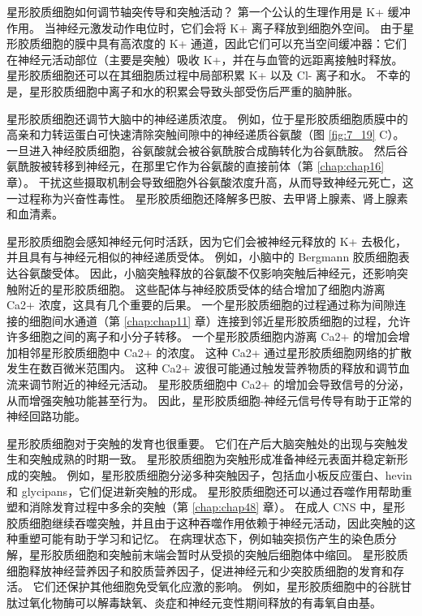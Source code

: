 星形胶质细胞如何调节轴突传导和突触活动？ 
第一个公认的生理作用是 K+ 缓冲作用。 
当神经元激发动作电位时，它们会将 K+ 离子释放到细胞外空间。 
由于星形胶质细胞的膜中具有高浓度的 K+ 通道，因此它们可以充当空间缓冲器：它们在神经元活动部位（主要是突触）吸收 K+，并在与血管的远距离接触时释放。 
星形胶质细胞还可以在其细胞质过程中局部积累 K+ 以及 Cl- 离子和水。 
不幸的是，星形胶质细胞中离子和水的积累会导致头部受伤后严重的脑肿胀。


星形胶质细胞还调节大脑中的神经递质浓度。 
例如，位于星形胶质细胞质膜中的高亲和力转运蛋白可快速清除突触间隙中的神经递质谷氨酸（图 \ref{fig:7_19} C）。 
一旦进入神经胶质细胞，谷氨酸就会被谷氨酰胺合成酶转化为谷氨酰胺。 
然后谷氨酰胺被转移到神经元，在那里它作为谷氨酸的直接前体（第 \ref{chap:chap16} 章）。 
干扰这些摄取机制会导致细胞外谷氨酸浓度升高，从而导致神经元死亡，这一过程称为兴奋性毒性。 
星形胶质细胞还降解多巴胺、去甲肾上腺素、肾上腺素和血清素。


星形胶质细胞会感知神经元何时活跃，因为它们会被神经元释放的 K+ 去极化，并且具有与神经元相似的神经递质受体。 
例如，小脑中的 Bergmann 胶质细胞表达谷氨酸受体。 
因此，小脑突触释放的谷氨酸不仅影响突触后神经元，还影响突触附近的星形胶质细胞。 
这些配体与神经胶质受体的结合增加了细胞内游离 Ca2+ 浓度，这具有几个重要的后果。 
一个星形胶质细胞的过程通过称为间隙连接的细胞间水通道（第 \ref{chap:chap11} 章）连接到邻近星形胶质细胞的过程，允许许多细胞之间的离子和小分子转移。 
一个星形胶质细胞内游离 Ca2+ 的增加会增加相邻星形胶质细胞中 Ca2+ 的浓度。 
这种 Ca2+ 通过星形胶质细胞网络的扩散发生在数百微米范围内。 
这种 Ca2+ 波很可能通过触发营养物质的释放和调节血流来调节附近的神经元活动。 
星形胶质细胞中 Ca2+ 的增加会导致信号的分泌，从而增强突触功能甚至行为。 
因此，星形胶质细胞-神经元信号传导有助于正常的神经回路功能。


星形胶质细胞对于突触的发育也很重要。 
它们在产后大脑突触处的出现与突触发生和突触成熟的时期一致。 
星形胶质细胞为突触形成准备神经元表面并稳定新形成的突触。 
例如，星形胶质细胞分泌多种突触因子，包括血小板反应蛋白、hevin 和 glycipans，它们促进新突触的形成。 
星形胶质细胞还可以通过吞噬作用帮助重塑和消除发育过程中多余的突触（第 \ref{chap:chap48} 章）。 
在成人 CNS 中，星形胶质细胞继续吞噬突触，并且由于这种吞噬作用依赖于神经元活动，因此突触的这种重塑可能有助于学习和记忆。 
在病理状态下，例如轴突损伤产生的染色质分解，星形胶质细胞和突触前末端会暂时从受损的突触后细胞体中缩回。 
星形胶质细胞释放神经营养因子和胶质营养因子，促进神经元和少突胶质细胞的发育和存活。 
它们还保护其他细胞免受氧化应激的影响。 
例如，星形胶质细胞中的谷胱甘肽过氧化物酶可以解毒缺氧、炎症和神经元变性期间释放的有毒氧自由基。


